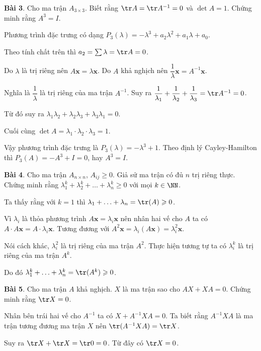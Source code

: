 \hfill

\textbf{Bài 3}. Cho ma trận $A_{3 \times 3}$. Biết rằng $\tr A = \tr A^{-1} = 0$ và $\det A = 1$. Chứng minh rằng $A^3 = I$.

Phương trình đặc trưng có dạng $P_3(\lambda) = -\lambda^3 + a_2 \lambda^2 + a_1 \lambda + a_0$.

Theo tính chất trên thì $a_2 = \sum \lambda = \tr A = 0$.

Do $\lambda$ là trị riêng nên $A \bm{x} = \lambda \bm{x}$. Do $A$ khả nghịch nên $\dfrac{1}{\lambda} \bm{x} = A^{-1} \bm{x}$.

Nghĩa là $\dfrac{1}{\lambda}$ là trị riêng của ma trận $A^{-1}$. Suy ra $\dfrac{1}{\lambda_1} + \dfrac{1}{\lambda_2} + \dfrac{1}{\lambda_3} = \tr A^{-1} = 0$.

Từ đó suy ra $\lambda_1 \lambda_2 + \lambda_2 \lambda_3 + \lambda_3 \lambda_1 = 0$.

Cuối cùng $\det A = \lambda_1 \cdot \lambda_2 \cdot \lambda_3 = 1$.

Vậy phương trình đặc trưng là $P_3(\lambda) = -\lambda^3 + 1$. Theo định lý Cayley-Hamilton thì $P_3(A) = -A^3 + I = 0$, hay $A^3 = I$.

\hfill

\textbf{Bài 4}. Cho ma trận $A_{n \times n}$, $A_{ij} \geqslant 0$. Giả sử ma trận có đủ $n$ trị riêng thực. Chứng minh rằng $\lambda_1^k + \lambda_2^k + \ldots + \lambda_n^k \geqslant 0$ với mọi $k \in \NN$.

Ta thấy rằng với $k=1$ thì $\lambda_1 + \ldots + \lambda_n = \tr(A) \geqslant 0$.

Vì $\lambda_i$ là thỏa phương trình $A \bm{x} = \lambda_i \bm{x}$ nên nhân hai vế cho $A$ ta có $A \cdot A \bm{x} = A \cdot \lambda_i \bm{x}$. Tương đương với $A^2 \bm{x} = \lambda_i (A \bm{x}) = \lambda_i^2 \bm{x}$.

Nói cách khác, $\lambda_i^2$ là trị riêng của ma trận $A^2$. Thực hiện tương tự ta có $\lambda_i^k$ là trị riêng của ma trận $A^k$.

Do đó $\lambda_1^k + \ldots + \lambda_n^k = \tr(A^k) \geqslant 0$.

\hfill

\textbf{Bài 5}. Cho ma trận $A$ khả nghịch. $X$ là ma trận sao cho $AX + XA = 0$. Chứng minh rằng $\tr X = 0$.

Nhân bên trái hai vế cho $A^{-1}$ ta có $X + A^{-1} X A = 0$. Ta biết rằng $A^{-1} X A$ là ma trận tương đương ma trận $X$ nên $\tr (A^{-1} X A) = \tr X$.

Suy ra $\tr X + \tr X = \tr 0 = 0$. Từ đây có $\tr X = 0$.

